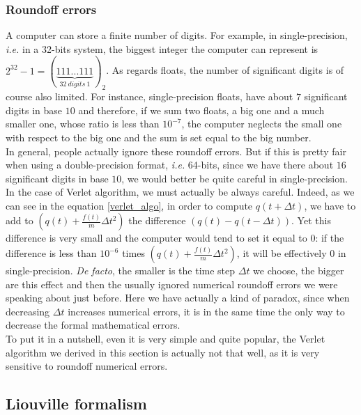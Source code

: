    \subsubsection{Roundoff errors}
    A computer can store a finite number of digits. For example, in single-precision, \textit{i.e.} in a 32-bits system, the biggest integer the computer can represent is $2^{32}-1=(\underbrace{111...111}_{32~digits~1})_2$. As regards floats, the number of significant digits is of course also limited. For instance, single-precision floats, have about $7$ significant digits in base $10$ and therefore, if we sum two floats, a big one and a much smaller one, whose ratio is less than $10^{-7}$, the computer neglects the small one with respect to the big one and the sum is set equal to the big number.
    \\In general, people actually ignore these roundoff errors. But if this is pretty fair when using a double-precision format, \textit{i.e.} 64-bits, since we have there about $16$ significant digits in base $10$, we would better be quite careful in single-precision.
    \\In the case of Verlet algorithm, we must actually be always careful. Indeed, as we can see in the equation \eqref{verlet_algo}, in order to compute $q(t+\Delta t)$, we have to add to $(q(t)+\frac{f(t)}{m}\Delta t^2)$ the difference $(q(t)-q(t-\Delta t))$. Yet this difference is very small and the computer would tend to set it equal to $0$: if the difference is less than $10^{-6}$ times $(q(t)+\frac{f(t)}{m}\Delta t^2)$, it will be effectively $0$ in single-precision. \textit{De facto}, the smaller is the time step $\Delta t$ we choose, the bigger are this effect and then the usually ignored numerical roundoff errors we were speaking about just before. Here we have actually a kind of paradox, since when decreasing $\Delta t$ increases numerical errors, it is in the same time the only way to decrease the formal mathematical errors.
    \newline
    \\To put it in a nutshell, even it is very simple and quite popular, the Verlet algorithm we derived in this section is actually not that well, as it is very sensitive to roundoff numerical errors.
    
\subsection{Liouville formalism}

